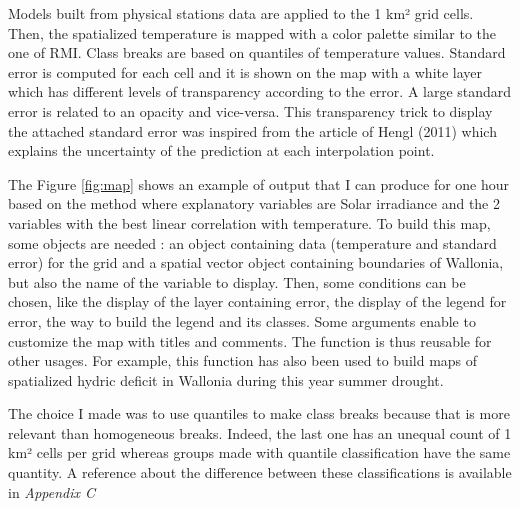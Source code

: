 \documentclass[12pt,twoside]{reedthesis}
\theoremstyle{definition}
\theoremstyle{definition}
\theoremstyle{definition}
\theoremstyle{remark}
\begin{document}
Models built from physical stations data are applied to the 1 km² grid
cells. Then, the spatialized temperature is mapped with a color palette
similar to the one of RMI. Class breaks are based on quantiles of
temperature values. Standard error is computed for each cell and it is
shown on the map with a white layer which has different levels of
transparency according to the error. A large standard error is related
to an opacity and vice-versa. This transparency trick to display the
attached standard error was inspired from the article of Hengl (2011)
which explains the uncertainty of the prediction at each interpolation
point.

The Figure \ref{fig:map} shows an example of output that I can produce
for one hour based on the method where explanatory variables are Solar
irradiance and the 2 variables with the best linear correlation with
temperature. To build this map, some objects are needed : an object
containing data (temperature and standard error) for the grid and a
spatial vector object containing boundaries of Wallonia, but also the
name of the variable to display. Then, some conditions can be chosen,
like the display of the layer containing error, the display of the
legend for error, the way to build the legend and its classes. Some
arguments enable to customize the map with titles and comments. The
function is thus reusable for other usages. For example, this function
has also been used to build maps of spatialized hydric deficit in
Wallonia during this year summer drought.

The choice I made was to use quantiles to make class breaks because that
is more relevant than homogeneous breaks. Indeed, the last one has an
unequal count of 1 km² cells per grid whereas groups made with quantile
classification have the same quantity. A reference about the difference
between these classifications is available in \emph{Appendix C}
\end{document}
